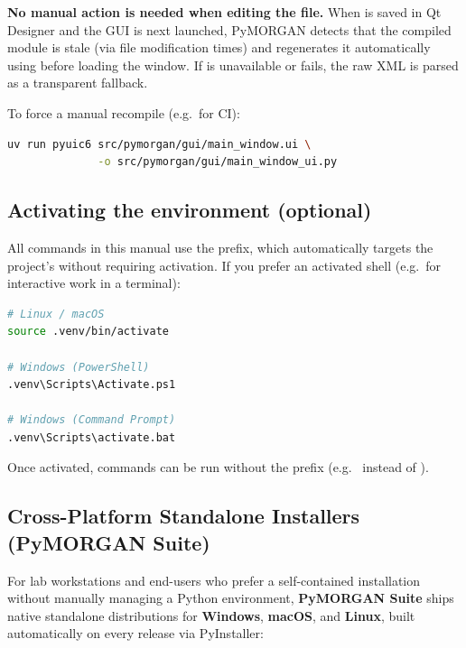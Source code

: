 \textbf{No manual action is needed when editing the  file.} When
 is saved in Qt Designer and the GUI is next launched,
PyMORGAN detects that the compiled module is stale (via file modification
times) and regenerates it automatically using  before loading
the window. If  is unavailable or fails, the raw XML is parsed
as a transparent fallback.

To force a manual recompile (e.g.\ for CI):

\begin{lstlisting}[language=bash, style=py]
uv run pyuic6 src/pymorgan/gui/main_window.ui \
              -o src/pymorgan/gui/main_window_ui.py
\end{lstlisting}

\subsection{Activating the environment (optional)}\label{sec:activate}

All commands in this manual use the  prefix, which
automatically targets the project's  without requiring
activation. If you prefer an activated shell (e.g.\ for interactive work
in a terminal):

\begin{lstlisting}[language=bash, style=py]
# Linux / macOS
source .venv/bin/activate

# Windows (PowerShell)
.venv\Scripts\Activate.ps1

# Windows (Command Prompt)
.venv\Scripts\activate.bat
\end{lstlisting}

Once activated, commands can be run without the  prefix
(e.g.\ \code{pymorgan-gui} instead of \code{uv run pymorgan-gui}).

\subsection{Cross-Platform Standalone Installers (PyMORGAN Suite)}\label{sec:installer}

For lab workstations and end-users who prefer a self-contained installation without manually managing a Python environment, \textbf{PyMORGAN Suite} ships native standalone distributions for \textbf{Windows}, \textbf{macOS}, and \textbf{Linux}, built automatically on every release via PyInstaller:

